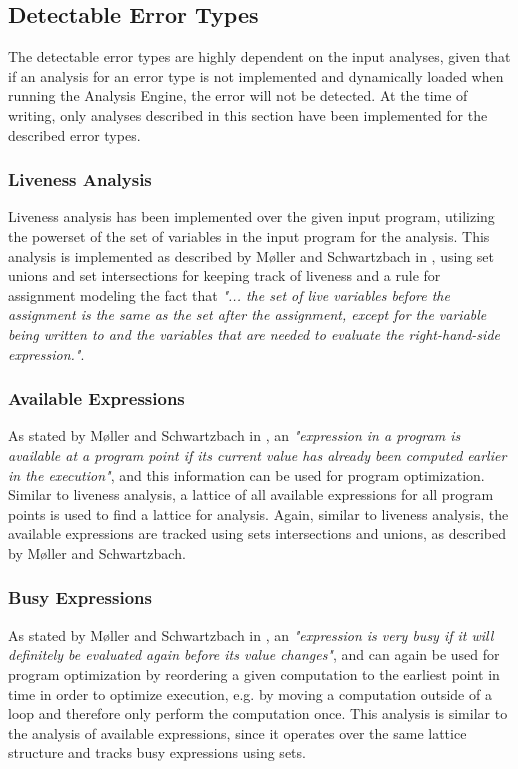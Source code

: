 \subsection{Detectable Error Types}

The detectable error types are highly dependent on the input analyses, given that if an analysis for an error type is not implemented and dynamically loaded when running the Analysis Engine, the error will not be detected. At the time of writing, only analyses described in this section have been implemented for the described error types. 

\subsubsection{Liveness Analysis}
Liveness analysis has been implemented over the given input program, utilizing the powerset of the set of variables in the input program for the analysis. 
This analysis is implemented as described by Møller and Schwartzbach in \cite{spa}, using set unions and set intersections for keeping track of liveness and a rule for assignment modeling the fact that \textit{"... the set of live variables before the assignment is the same as the set after the assignment, except for the variable being written to and the variables that are needed to evaluate the right-hand-side expression."}. 

\subsubsection{Available Expressions}
As stated by Møller and Schwartzbach in \cite{spa}, an \textit{"expression in a program is available at a program point if its current value has already been computed earlier in the execution"}, and this information can be used for program optimization. Similar to liveness analysis, a lattice of all available expressions for all program points is used to find a lattice for analysis. Again, similar to liveness analysis, the available expressions are tracked using sets intersections and unions, as described by Møller and Schwartzbach. 

\subsubsection{Busy Expressions}
As stated by Møller and Schwartzbach in \cite{spa}, an \textit{"expression is very busy if it will definitely be evaluated again before its value changes"}, and can again be used for program optimization by reordering a given computation to the earliest point in time in order to optimize execution, e.g. by moving a computation outside of a loop and therefore only perform the computation once. This analysis is similar to the analysis of available expressions, since it operates over the same lattice structure and tracks busy expressions using sets. 

\newpar {}